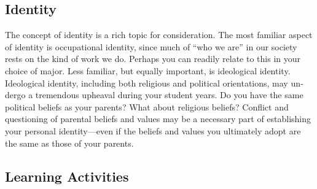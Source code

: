 \documentclass[
]{book}
\begin{document}
\hypertarget{identity}{%
\subsection*{Identity}\label{identity}}

The concept of identity is a rich topic for consideration. The most familiar aspect of identity is occupational identity, since much of ``who we are'' in our society rests on the kind of work we do. Perhaps you can readily relate to this in your choice of major. Less familiar, but equally important, is ideological identity. Ideologi­cal identity, including both religious and political orientations, may un­dergo a tremen­dous upheaval during your student years. Do you have the same political beliefs as your parents? What about religious beliefs? Conflict and questioning of parental beliefs and values may be a necessary part of establishing your personal iden­tity---even if the beliefs and values you ultimately adopt are the same as those of your parents.

\hypertarget{learning-activities-1}{%
\subsection*{Learning Activities}\label{learning-activities-1}}
\end{document}
